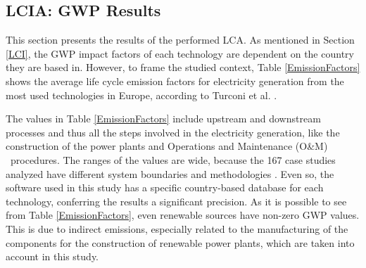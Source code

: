 {\subsection{LCIA: GWP Results}
\label{LCIA}

This section presents the results of the performed LCA. As mentioned in Section \ref{LCI}, the GWP impact factors of each technology are dependent on the country they are based in. However, to frame the studied context, Table \ref{EmissionFactors} shows the average life cycle emission factors for electricity generation from the most used technologies in Europe, according to Turconi et al. \cite{Turconi2013LifeLimitations}.

The values in  Table \ref{EmissionFactors} include upstream and downstream processes and thus all the steps involved in the electricity generation, like the construction of the power plants and Operations and Maintenance (O\&M)%
~procedures. The ranges of the values are wide, because the 167 case studies analyzed have different system boundaries and methodologies \cite{Turconi2013LifeLimitations}. Even so, the software used in this study has a specific country-based database for each technology, conferring the results a significant precision. {As it is possible to see from Table \ref{EmissionFactors}, even renewable sources have non-zero GWP values. This is due to indirect emissions, especially related to the manufacturing of the components for the construction of renewable power plants, which are taken into account in this study.}  

}
